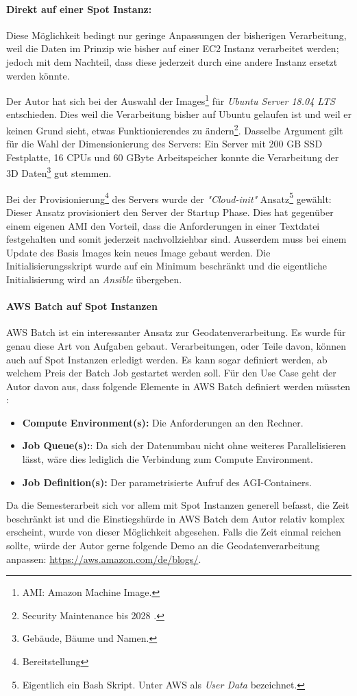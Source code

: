 \paragraph{Direkt auf einer Spot Instanz:}
Diese Möglichkeit bedingt nur geringe Anpassungen der bisherigen Verarbeitung, weil die Daten im Prinzip wie bisher auf einer EC2 Instanz verarbeitet werden; jedoch mit dem Nachteil, dass diese jederzeit durch eine andere Instanz ersetzt werden könnte.

Der Autor hat sich bei der Auswahl der Images\footnote{AMI: Amazon Machine Image.} für \emph{Ubuntu Server 18.04 LTS} entschieden. Dies weil die Verarbeitung bisher auf Ubuntu gelaufen ist und weil er keinen Grund sieht, etwas Funktionierendes zu ändern\footnote{Security Maintenance bis 2028 \cite{Ubuntu2020}.}. Dasselbe Argument gilt für die Wahl der Dimensionierung des Servers: Ein Server mit 200 GB SSD Festplatte, 16 CPUs und 60 GByte Arbeitspeicher konnte die Verarbeitung der 3D Daten\footnote{Gebäude, Bäume und Namen.} gut stemmen.

Bei der Provisionierung\footnote{Bereitstellung} des Servers wurde der \emph{"Cloud-init"} Ansatz\footnote{Eigentlich ein Bash Skript. Unter AWS als \emph{User Data} bezeichnet.} gewählt: Dieser Ansatz provisioniert den Server der Startup Phase. Dies hat gegenüber einem eigenen AMI den Vorteil, dass die Anforderungen in einer Textdatei festgehalten und somit jederzeit nachvollziehbar sind. Ausserdem muss bei einem Update des Basis Images kein neues Image gebaut werden.
Die Initialisierungsskript wurde auf ein Minimum beschränkt und die eigentliche Initialisierung wird an \emph{Ansible} übergeben. 

\paragraph{AWS Batch auf Spot Instanzen}
AWS Batch ist ein interessanter Ansatz zur Geodatenverarbeitung. Es wurde für genau diese Art von Aufgaben gebaut. Verarbeitungen, oder Teile davon, können auch auf Spot Instanzen erledigt werden. Es kann sogar definiert werden, ab welchem Preis der Batch Job gestartet werden soll. Für den Use Case geht der Autor davon aus, dass folgende Elemente in AWS Batch definiert werden müssten \cite{Batch2020}: 
\begin{itemize}
\item{\textbf{Compute Environment(s):} Die Anforderungen an den Rechner.}
\item{\textbf{Job Queue(s):}: Da sich der Datenumbau nicht ohne weiteres Parallelisieren lässt, wäre dies lediglich die Verbindung zum Compute Environment.}
\item{\textbf{Job Definition(s):}} Der parametrisierte Aufruf des AGI-Containers.
\end{itemize}
Da die Semesterarbeit sich vor allem mit Spot Instanzen generell befasst, die Zeit beschränkt ist und die Einstiegshürde in AWS Batch dem Autor relativ komplex erscheint, wurde von dieser Möglichkeit abgesehen. Falls die Zeit einmal reichen sollte, würde der Autor gerne folgende Demo an die Geodatenverarbeitung anpassen:
\href{https://aws.amazon.com/de/blogs/compute/creating-a-simple-fetch-and-run-aws-batch-job/}{https://aws.amazon.com/de/blogs/}.

